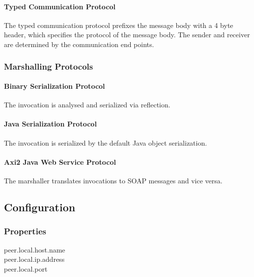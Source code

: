 \paragraph{Typed Communication Protocol}

The typed communication protocol prefixes the message body with a 4 byte header, which specifies the protocol of the message body.
The sender and receiver are determined by the communication end points.

\subsubsection{Marshalling Protocols}

\paragraph{Binary Serialization Protocol}

The invocation is analysed and serialized via reflection.

\paragraph{Java Serialization Protocol}

The invocation is serialized by the default Java object serialization.

\paragraph{Axi2 Java Web Service Protocol}

The marshaller translates invocations to SOAP messages and vice versa.

\subsection{Configuration}

\subsubsection{Properties}

peer.local.host.name\\
peer.local.ip.address\\
peer.local.port\\
